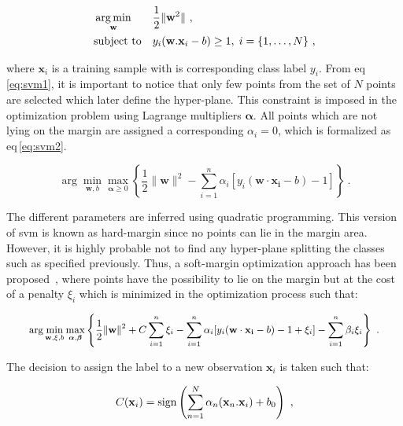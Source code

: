 \begin{equation}
\begin{aligned}
& \operatorname*{arg\,min}_{\mathbf{w}}
& & \frac{1}{2} \| \mathbf{w}^2\| \ , \\
& \text{subject to}
& & y_i(\mathbf{w}.\mathbf{x}_i - b) \geq 1, \; i = \{ 1, \ldots, N \} \ ,
\end{aligned}
\label{eq:svm1}
\end{equation}

\noindent where $\mathbf{x}_i$ is a training sample with is corresponding class label $y_i$.
From \acs{eq}\,\eqref{eq:svm1}, it is important to notice that only few points from the set of $N$ points are selected which later define the hyper-plane.
This constraint is imposed in the optimization problem using Lagrange multipliers $\boldsymbol{\alpha}$.
All points which are not lying on the margin are assigned a corresponding $\alpha_i = 0$, which is formalized as \acs{eq}\,\eqref{eq:svm2}.

\begin{equation}
	\arg\min_{\mathbf{w},b } \max_{\boldsymbol{\alpha}\geq 0 } \left\{ \frac{1}{2}\|\mathbf{w}\|^2 - \sum_{i=1}^{n}{\alpha_i[y_i(\mathbf{w}\cdot \mathbf{x_i} - b)-1]} \right\} \ .
	\label{eq:svm2}
\end{equation}

The different parameters are inferred using quadratic programming.
This version of \ac{svm} is known as hard-margin since no points can lie in the margin area.
However, it is highly probable not to find any hyper-plane splitting the classes such as specified previously.
Thus, a soft-margin optimization approach has been proposed~\cite{Cortes1995}, where points have the possibility to lie on the margin but at the cost of a penalty $\xi_i$ which is minimized in the optimization process such that:

\begin{equation}
\small
\arg\min_{\mathbf{w},\mathbf{\xi}, b } \max_{\boldsymbol{\alpha},\boldsymbol{\beta} } \left\{ \frac{1}{2}\|\mathbf{w}\|^2+C \sum_{i=1}^n \xi_i - \sum_{i=1}^{n}{\alpha_i[y_i(\mathbf{w}\cdot \mathbf{x_i} - b) -1 + \xi_i]} - \sum_{i=1}^{n} \beta_i \xi_i \right\} \ .
\end{equation}

The decision to assign the label to a new observation $\mathbf{x}_i$ is taken such that:

\begin{equation}
	C(\mathbf{x}_i) = \operatorname*{sign} \left( \sum_{n=1}^{N} \alpha_n (\mathbf{x}_n . \mathbf{x}_i) + b_0 \right) \ ,
	\label{eq:svmdec} 
\end{equation}

